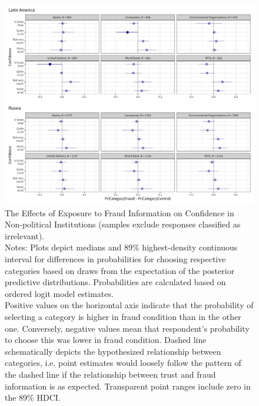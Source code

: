 \documentclass[11pt, ngerman,english,a4]{article}
\begin{document}
\begin{figure}[H]
	\centering
	\includegraphics[width=\linewidth,trim=4 4 4 4,clip]{figs/main_hdi89_6.png}
	\caption{The Effects of Exposure to Fraud Information on Confidence in Non-political Institutions (samples exclude responses classified as irrelevant).  \\
		\footnotesize{Notes: Plots depict medians and 89\% highest-density continuous interval for differences in probabilities for choosing respective categories based on draws from the expectation of the posterior predictive distributions. Probabilities are calculated based on ordered logit model estimates.\\
			Positive values on the horizontal axis indicate that the probability of selecting a category is higher in fraud condition than in the other one. Conversely, negative values mean that respondent's probability to choose this was lower in fraud condition. Dashed line schematically depicts the hypothesized relationship between categories, i.e. point estimates would loosely follow the pattern of the dashed line if the relationship between trust and fraud information is as expected. Transparent point ranges include zero in the 89\% HDCI.\\
	} }
	\singlespacing
	\raggedright
	\label{fig:main-6}
\end{figure}
    
    
\clearpage
\end{document}
